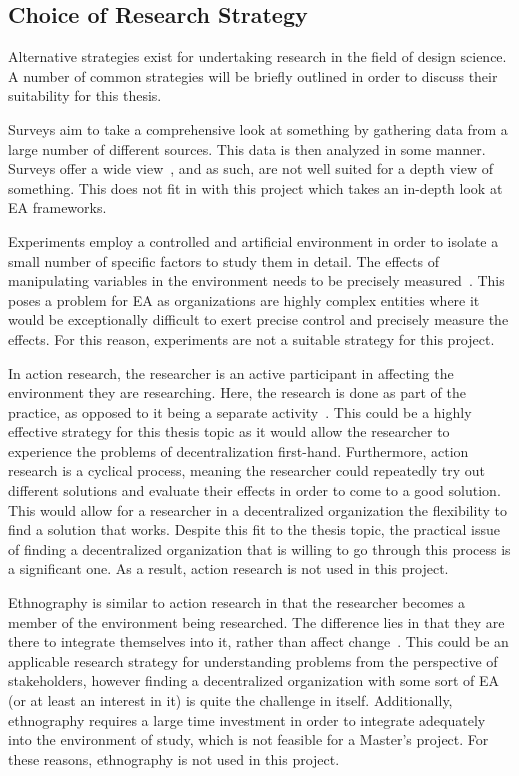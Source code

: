 \subsection{Choice of Research Strategy}

Alternative strategies exist for undertaking research in the field of design science. A number of common strategies will be briefly outlined in order to discuss their suitability for this thesis. 

Surveys aim to take a comprehensive look at something by gathering data from a large number of different sources. This data is then analyzed in some manner. Surveys offer a wide view~\cite{denscombe2010good,johannessonPerjons2012}, and as such, are not well suited for a depth view of something. This does not fit in with this project which takes an in-depth look at EA frameworks. 

Experiments employ a controlled and artificial environment in order to isolate a small number of specific factors to study them in detail. The effects of manipulating variables in the environment needs to be precisely measured~\cite{denscombe2010good}. This poses a problem for EA as organizations are highly complex entities where it would be exceptionally difficult to exert precise control and precisely measure the effects. For this reason, experiments are not a suitable strategy for this project. 

In action research, the researcher is an active participant in affecting the environment they are researching. Here, the research is done as part of the practice, as opposed to it being a separate activity~\cite{denscombe2010good}. This could be a highly effective strategy for this thesis topic as it would allow the researcher to experience the problems of decentralization first-hand. Furthermore, action research is a cyclical process, meaning the researcher could repeatedly try out different solutions and evaluate their effects in order to come to a good solution. This would allow for a researcher in a decentralized organization the flexibility to find a solution that works. Despite this fit to the thesis topic, the practical issue of finding a decentralized organization that is willing to go through this process is a significant one. As a result, action research is not used in this project. 

Ethnography is similar to action research in that the researcher becomes a member of the environment being researched. The difference lies in that they are there to integrate themselves into it, rather than affect change~\cite{denscombe2010good}. This could be an applicable research strategy for understanding problems from the perspective of stakeholders, however finding a decentralized organization with some sort of EA (or at least an interest in it) is quite the challenge in itself. Additionally, ethnography requires a large time investment in order to integrate adequately into the environment of study, which is not feasible for a Master's project. For these reasons, ethnography is not used in this project. 

